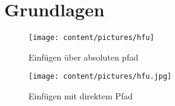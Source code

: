 \chapter{Grundlagen}
\begin{figure}
\caption{Einfügen über absoluten pfad}
\texttt{[image: content/pictures/hfu]}
\label{pic:bild3}
\end{figure}

\begin{figure}
	\centering
		\texttt{[image: content/pictures/hfu.jpg]}
	\caption{Einfügen mit direktem Pfad}
	\label{La12bel}
\end{figure}